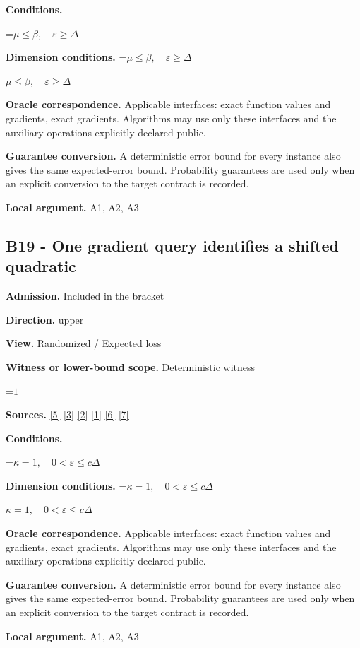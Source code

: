 \documentclass[10pt,a4paper]{article}
\newcommand{\AtlasMath}[1]{\par\begingroup\centering\setbox0=\hbox{$\displaystyle #1$}\ifdim\wd0>1.4\linewidth\typeout{ATLAS WIDE FORMULA: \the\wd0}\fi\ifdim\wd0>\linewidth\resizebox{\linewidth}{!}{\box0}\else\box0\fi\par\endgroup}
\newcommand{\AtlasInlineMath}[1]{\begingroup\setbox0=\hbox{$#1$}\ifdim\wd0>.4\linewidth\endgroup\AtlasMath{#1}\else\endgroup$#1$\fi}
\begin{document}
\textbf{Conditions.} 
\AtlasMath{\mu\le\beta,\quad\varepsilon\ge\Delta}


\textbf{Dimension conditions.} \AtlasInlineMath{\mu\le\beta,\quad\varepsilon\ge\Delta}

\textbf{Oracle correspondence.} Applicable interfaces: exact function values and gradients, exact gradients. Algorithms may use only these interfaces and the auxiliary operations explicitly declared public.

\textbf{Guarantee conversion.} A deterministic error bound for every instance also gives the same expected-error bound. Probability guarantees are used only when an explicit conversion to the target contract is recorded.

\textbf{Local argument.} A1, A2, A3

\subsection{B19 - One gradient query identifies a shifted quadratic}
\textbf{Admission.} Included in the bracket

\textbf{Direction.} upper

\textbf{View.} Randomized / Expected loss

\textbf{Witness or lower-bound scope.} Deterministic witness

\AtlasMath{1}
\textbf{Sources.} \href{https://arxiv.org/pdf/2101.09740v2}{[5]} \href{https://arxiv.org/pdf/2609.33360v2}{[3]} \href{https://arxiv.org/pdf/2609.10874}{[2]} \href{https://arxiv.org/pdf/1405.4980}{[1]} \href{https://www2.isye.gatech.edu/~nemirovs/MOR_AccuracyCertificates.pdf}{[6]} \href{https://arxiv.org/pdf/2609.20701}{[7]}

\textbf{Conditions.} 
\AtlasMath{\kappa=1,\quad0<\varepsilon\le c\Delta}


\textbf{Dimension conditions.} \AtlasInlineMath{\kappa=1,\quad0<\varepsilon\le c\Delta}

\textbf{Oracle correspondence.} Applicable interfaces: exact function values and gradients, exact gradients. Algorithms may use only these interfaces and the auxiliary operations explicitly declared public.

\textbf{Guarantee conversion.} A deterministic error bound for every instance also gives the same expected-error bound. Probability guarantees are used only when an explicit conversion to the target contract is recorded.

\textbf{Local argument.} A1, A2, A3
\end{document}
